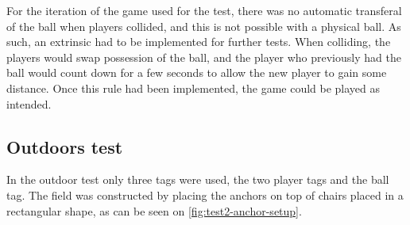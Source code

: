 For the iteration of the game used for the test, there was no automatic transferal of the ball when players collided, and this is not possible with a physical ball.
As such, an extrinsic had to be implemented for further tests.
When colliding, the players would swap possession of the ball, and the player who previously had the ball would count down for a few seconds to allow the new player to gain some distance.
Once this rule had been implemented, the game could be played as intended.

\subsection{Outdoors test}
In the outdoor test only three tags were used, the two player tags and the ball tag.
The field was constructed by placing the anchors on top of chairs placed in a rectangular shape, as can be seen on \autoref{fig:test2-anchor-setup}.

